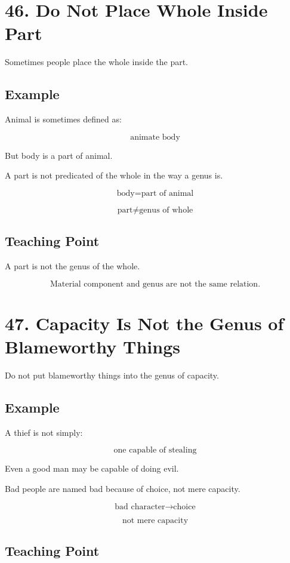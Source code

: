 \documentclass[12pt]{article}
\begin{document}
\section*{46. Do Not Place Whole Inside Part}

Sometimes people place the whole inside the part.

\subsection*{Example}

Animal is sometimes defined as:

\[
\text{animate body}
\]

But body is a part of animal.

A part is not predicated of the whole in the way a genus is.

\[
\text{body} = \text{part of animal}
\]

\[
\text{part} \neq \text{genus of whole}
\]

\subsection*{Teaching Point}

A part is not the genus of the whole.

\[
\boxed{
\text{Material component and genus are not the same relation.}
}
\]

\section*{47. Capacity Is Not the Genus of Blameworthy Things}

Do not put blameworthy things into the genus of capacity.

\subsection*{Example}

A thief is not simply:

\[
\text{one capable of stealing}
\]

Even a good man may be capable of doing evil.

Bad people are named bad because of choice, not mere capacity.

\[
\text{bad character} \rightarrow \text{choice}
\]

\[
\text{not mere capacity}
\]

\subsection*{Teaching Point}
\end{document}
